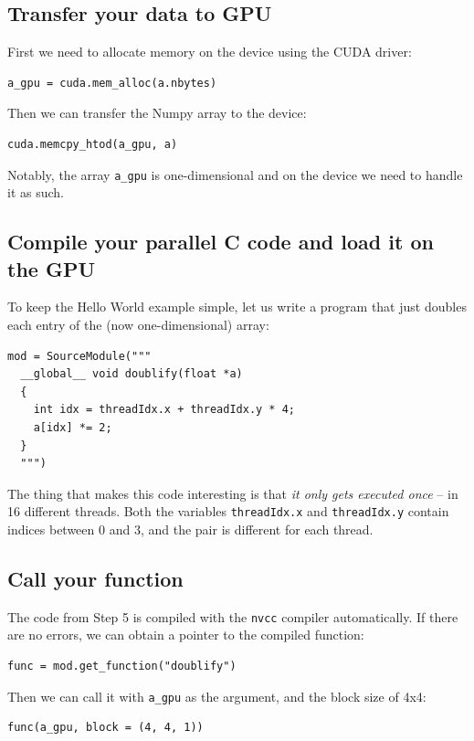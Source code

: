 \documentclass[article,A4,12pt]{llncs}
\begin{document}
\subsection{Transfer your data to GPU}

First we need to allocate memory on the device using the CUDA driver:
\begin{verbatim}
a_gpu = cuda.mem_alloc(a.nbytes)
\end{verbatim}
Then we can transfer the Numpy array to the device:

\begin{verbatim}
cuda.memcpy_htod(a_gpu, a)
\end{verbatim}
Notably, the array {\tt a\_gpu} is one-dimensional and on the device we need to 
handle it as such.

\subsection{Compile your parallel C code and load it on the GPU}

To keep the Hello World example simple, let us write a program that just doubles 
each entry of the (now one-dimensional) array:
\begin{verbatim}
mod = SourceModule("""
  __global__ void doublify(float *a)
  {
    int idx = threadIdx.x + threadIdx.y * 4;
    a[idx] *= 2;
  }
  """)
\end{verbatim}
The thing that makes this code interesting is that {\em it only gets executed
once} -- in 16 different threads. Both the variables {\tt threadIdx.x} and {\tt threadIdx.y}
contain indices between $0$ and $3$, and the pair is different for each thread. 

\subsection{Call your function}

The code from Step 5 is compiled with the {\tt nvcc} compiler automatically. 
If there are no errors, we can obtain a pointer to the compiled function:

\begin{verbatim}
func = mod.get_function("doublify")
\end{verbatim}
Then we can call it with {\tt a\_gpu} as the argument, and the block size of 4x4:

\begin{verbatim}
func(a_gpu, block = (4, 4, 1))
\end{verbatim}
\end{document}
